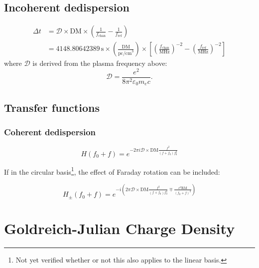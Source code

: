 \documentclass{book}
\begin{document}
\subsection{Incoherent dedispersion}

\begin{equation}
\begin{aligned}
    \Delta t
        &= \mathcal{D} \times \text{DM} \times \left( \frac{1}{f_\text{chan}} - \frac{1}{f_\text{ref}} \right) \\
        &= 4148.80642389\,\text{s} \times
          \left(\frac{\text{DM}}{\text{pc/cm}^3}\right) \times \left[
              \left(\frac{f_\text{chan}}{\text{MHz}}\right)^{-2} -
              \left(\frac{f_\text{ref}}{\text{MHz}}\right)^{-2} \right]
\end{aligned}
\end{equation}
where $\mathcal{D}$ is derived from the plasma frequency above:
\begin{equation}
    \mathcal{D} = \frac{e^2}{8\pi^2\varepsilon_0 m_e c}.
\end{equation}

\subsection{Transfer functions}

\subsubsection{Coherent dedispersion}

\begin{equation}
    H(f_0 + f) = e^{-2\pi i \mathcal{D}\times\text{DM}\frac{f^2}{(f+f_0) f_0^2}}
\end{equation}

If in the circular basis\footnote{Not yet verified whether or not this also applies to the linear basis.}, the effect of Faraday rotation can be included:

\begin{equation}
    H_\pm(f_0 + f) = e^{-i \left(2\pi\mathcal{D}\times\text{DM}\frac{f^2}{(f+f_0) f_0^2} \mp \frac{c^2\text{RM}}{(f_0+f)^2}\right)}
\end{equation}

\section{Goldreich-Julian Charge Density}
\label{sec:GJ-charge-density}
\end{document}

